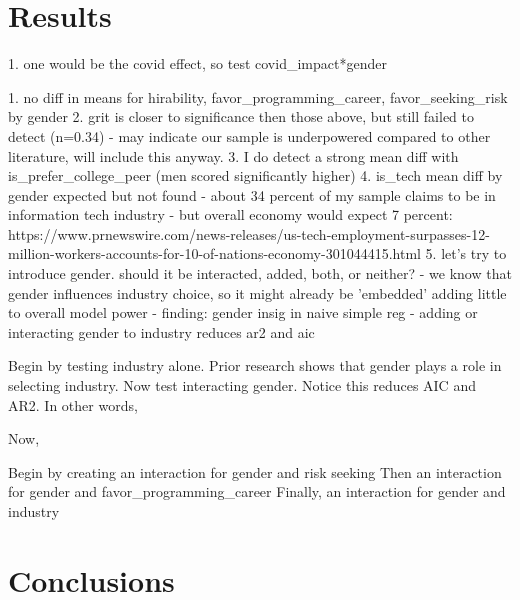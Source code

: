 \documentclass[review]{elsarticle}
\begin{document}
\section{Results}

1. one would be the covid effect, so test covid_impact*gender



1. no diff in means for hirability, favor_programming_career, favor_seeking_risk by gender
2. grit is closer to significance then those above, but still failed to detect (n=0.34)
    - may indicate our sample is underpowered compared to other literature, will include this anyway.
3. I do detect a strong mean diff with is_prefer_college_peer (men scored significantly higher)
4. is_tech mean diff by gender expected but not found
    - about 34 percent of my sample claims to be in information tech industry
    - but overall economy would expect 7 percent: https://www.prnewswire.com/news-releases/us-tech-employment-surpasses-12-million-workers-accounts-for-10-of-nations-economy-301044415.html
5. let's try to introduce gender. should it be interacted, added, both, or neither?
    - we know that gender influences industry choice, so it might already be 'embedded' adding little to overall model power
    - finding: gender insig in naive simple reg
    - adding or interacting gender to industry reduces ar2 and aic






Begin by testing industry alone. Prior research shows that gender plays a role in selecting industry.
Now test interacting gender. Notice this reduces AIC and AR2. In other words,

Now,

Begin by creating an interaction for gender and risk seeking
Then an interaction for gender and favor_programming_career
Finally, an interaction for gender and industry


\section{Conclusions}





\end{document}

